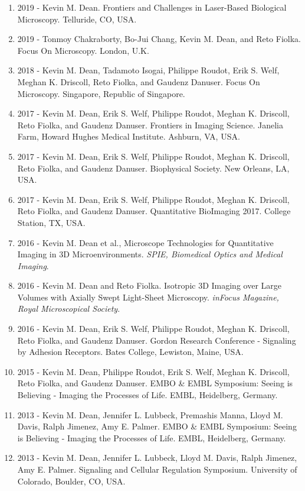 \documentclass[10pt]{res}
\begin{document}
\begin{resume}
\begin{enumerate}
\item 2019 - Kevin M. Dean. Frontiers and Challenges in Laser-Based Biological Microscopy. Telluride, CO, USA.
\item 2019 - Tonmoy Chakraborty, Bo-Jui Chang, Kevin M. Dean, and Reto Fiolka.  Focus On Microscopy.  London, U.K.  
\item 2018 - Kevin M. Dean, Tadamoto Isogai, Philippe Roudot, Erik S. Welf, Meghan K. Driscoll, Reto Fiolka, and Gaudenz Danuser.  Focus On Microscopy.  Singapore, Republic of Singapore. 
\item 2017 - Kevin M. Dean, Erik S. Welf, Philippe Roudot, Meghan K. Driscoll, Reto Fiolka, and Gaudenz Danuser.  Frontiers in Imaging Science.  Janelia Farm, Howard Hughes Medical Institute.  Ashburn, VA, USA.  
\item 2017 - Kevin M. Dean, Erik S. Welf, Philippe Roudot, Meghan K. Driscoll, Reto Fiolka, and Gaudenz Danuser.  Biophysical Society.  New Orleans, LA, USA. 
\item 2017 - Kevin M. Dean, Erik S. Welf, Philippe Roudot, Meghan K. Driscoll, Reto Fiolka, and Gaudenz Danuser.  Quantitative BioImaging 2017.  College Station, TX, USA. 
\item 2016 - Kevin M. Dean et al.,  Microscope Technologies for Quantitative Imaging in 3D Microenvironments.  {\it SPIE, Biomedical Optics and Medical Imaging}.  
\item 2016 - Kevin M. Dean and Reto Fiolka. Isotropic 3D Imaging over Large Volumes with Axially Swept Light-Sheet Microscopy.  {\it inFocus Magazine, Royal Microscopical Society}.  
\item 2016 - Kevin M. Dean, Erik S. Welf, Philippe Roudot, Meghan K. Driscoll, Reto Fiolka, and Gaudenz Danuser.  Gordon Research Conference - Signaling by Adhesion Receptors.  Bates College, Lewiston, Maine, USA. 
\item 2015 - Kevin M. Dean, Philippe Roudot, Erik S. Welf, Meghan K. Driscoll, Reto Fiolka, and Gaudenz Danuser.  EMBO \& EMBL Symposium: Seeing is Believing - Imaging the Processes of Life.  EMBL, Heidelberg, Germany.  
\item 2013 - Kevin M. Dean, Jennifer L. Lubbeck, Premashis Manna, Lloyd M. Davis, Ralph Jimenez, Amy E. Palmer.  EMBO \& EMBL Symposium: Seeing is Believing - Imaging the Processes of Life.  EMBL, Heidelberg, Germany.
\item 2013 - Kevin M. Dean, Jennifer L. Lubbeck, Lloyd M. Davis, Ralph Jimenez, Amy E. Palmer.  Signaling and Cellular Regulation Symposium.  University of Colorado, Boulder, CO, USA.  

\end{enumerate}
\end{resume}
\end{document}
